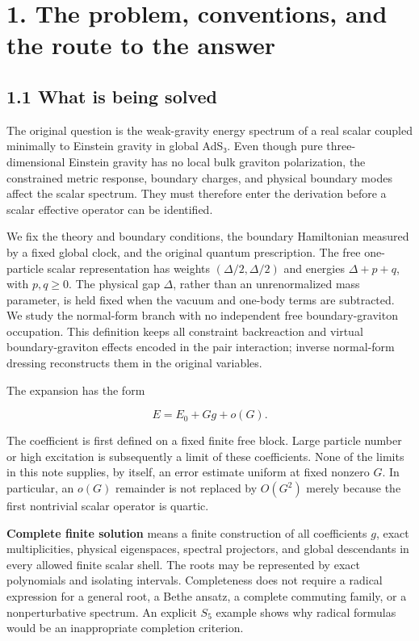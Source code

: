\documentclass[a4paper,11pt]{article}
\numberwithin{equation}{section}
\begin{document}
\clearpage
\tableofcontents
\clearpage
\clearpage
\hypertarget{the-problem-conventions-and-the-route-to-the-answer}{%
\section{1. The problem, conventions, and the route to the answer}\label{the-problem-conventions-and-the-route-to-the-answer}}

\hypertarget{what-is-being-solved}{%
\subsection{1.1 What is being solved}\label{what-is-being-solved}}

The original question is the weak-gravity energy spectrum of a real scalar coupled minimally to Einstein gravity in global AdS₃. Even though pure three-dimensional Einstein gravity has no local bulk graviton polarization, the constrained metric response, boundary charges, and physical boundary modes affect the scalar spectrum. They must therefore enter the derivation before a scalar effective operator can be identified.

We fix the theory and boundary conditions, the boundary Hamiltonian measured by a fixed global clock, and the original quantum prescription. The free one-particle scalar representation has weights \((\Delta/2,\Delta/2)\) and energies \(\Delta+p+q\), with \(p,q\ge0\). The physical gap \(\Delta\), rather than an unrenormalized mass parameter, is held fixed when the vacuum and one-body terms are subtracted. We study the normal-form branch with no independent free boundary-graviton occupation. This definition keeps all constraint backreaction and virtual boundary-graviton effects encoded in the pair interaction; inverse normal-form dressing reconstructs them in the original variables.

The expansion has the form

\[
E=E_0+Gg+o(G).
\tag{1.1}
\]

The coefficient is first defined on a fixed finite free block. Large particle number or high excitation is subsequently a limit of these coefficients. None of the limits in this note supplies, by itself, an error estimate uniform at fixed nonzero \(G\). In particular, an \(o(G)\) remainder is not replaced by \(O(G^2)\) merely because the first nontrivial scalar operator is quartic.

\textbf{Complete finite solution} means a finite construction of all coefficients \(g\), exact multiplicities, physical eigenspaces, spectral projectors, and global descendants in every allowed finite scalar shell. The roots may be represented by exact polynomials and isolating intervals. Completeness does not require a radical expression for a general root, a Bethe ansatz, a complete commuting family, or a nonperturbative spectrum. An explicit \(S_5\) example shows why radical formulas would be an inappropriate completion criterion.
\end{document}
